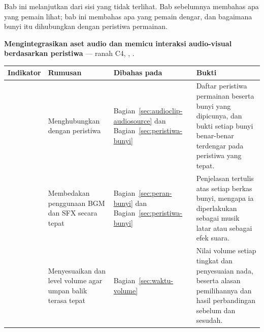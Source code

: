 \begin{subcpmkbox}
Bab ini melanjutkan  dari sisi yang tidak terlihat. Bab sebelumnya
membahas apa yang pemain lihat; bab ini membahas apa yang pemain dengar, dan
bagaimana bunyi itu dihubungkan dengan peristiwa permainan.

\vspace{0.5em}
\textbf{ Mengintegrasikan aset audio dan memicu interaksi
audio-visual berdasarkan peristiwa } --- ranah C4, ,
.

\vspace{0.5em}
{\setlength{\tabcolsep}{4pt}\footnotesize%
\begin{tabularx}{\textwidth}{@{}C{1.9cm} L{4.0cm} L{2.5cm} Y@{}}
\toprule
\headrow \textbf{Indikator} & \textbf{Rumusan} & \textbf{Dibahas pada} & \textbf{Bukti} \\
\midrule
{} & Menghubungkan  dengan peristiwa  &
Bagian~\ref{sec:audioclip-audiosource} dan Bagian~\ref{sec:peristiwa-bunyi} &
Daftar peristiwa permainan beserta bunyi yang dipicunya, dan bukti setiap bunyi
benar-benar terdengar pada peristiwa yang tepat. \\
\addlinespace
{} & Membedakan penggunaan BGM dan SFX secara tepat &
Bagian~\ref{sec:peran-bunyi} dan Bagian~\ref{sec:peristiwa-bunyi} &
Penjelasan tertulis atas setiap berkas bunyi, mengapa ia diperlakukan sebagai
musik latar atau sebagai efek suara. \\
\addlinespace
{} & Menyesuaikan  dan level volume agar umpan balik
terasa tepat &
Bagian~\ref{sec:waktu-volume} &
Nilai volume setiap tingkat dan penyesuaian nada, beserta alasan pemilihannya
dan hasil perbandingan sebelum dan sesudah. \\
\bottomrule
\end{tabularx}}
\end{subcpmkbox}
